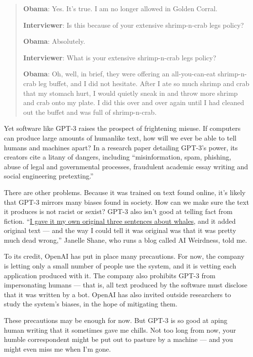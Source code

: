 \begin{quote}
\textbf{Obama}: Yes. It's true. I am no longer allowed in Golden Corral.

\textbf{Interviewer}: Is this because of your extensive shrimp-n-crab
legs policy?

\textbf{Obama}: Absolutely.

\textbf{Interviewer}: What is your extensive shrimp-n-crab legs policy?

\textbf{Obama}: Oh, well, in brief, they were offering an
all-you-can-eat shrimp-n-crab leg buffet, and I did not hesitate. After
I ate so much shrimp and crab that my stomach hurt, I would quietly
sneak in and throw more shrimp and crab onto my plate. I did this over
and over again until I had cleaned out the buffet and was full of
shrimp-n-crab.
\end{quote}

Yet software like GPT-3 raises the prospect of frightening misuse. If
computers can produce large amounts of humanlike text, how will we ever
be able to tell humans and machines apart? In a research paper detailing
GPT-3's power, its creators cite a litany of dangers, including
``misinformation, spam, phishing, abuse of legal and governmental
processes, fraudulent academic essay writing and social engineering
pretexting.''

There are other problems. Because it was trained on text found online,
it's likely that GPT-3 mirrors many biases found in society. How can we
make sure the text it produces is not racist or sexist? GPT-3 also isn't
good at telling fact from fiction.
``\href{https://aiweirdness.com/post/623543644426829825/facts-about-whales}{I
gave it my own original three sentences about whales}, and it added
original text --- and the way I could tell it was original was that it
was pretty much dead wrong,'' Janelle Shane, who runs a blog called AI
Weirdness, told me.

To its credit, OpenAI has put in place many precautions. For now, the
company is letting only a small number of people use the system, and it
is vetting each application produced with it. The company also prohibits
GPT-3 from impersonating humans --- that is, all text produced by the
software must disclose that it was written by a bot. OpenAI has also
invited outside researchers to study the system's biases, in the hope of
mitigating them.

These precautions may be enough for now. But GPT-3 is so good at aping
human writing that it sometimes gave me chills. Not too long from now,
your humble correspondent might be put out to pasture by a machine ---
and you might even miss me when I'm gone.

